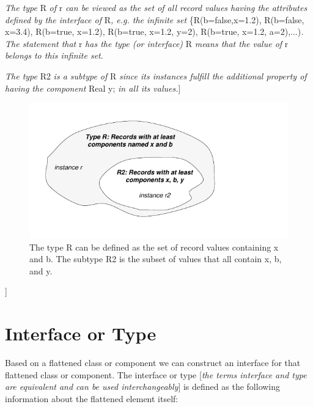 \documentclass[10pt,a4paper]{report}
\def\doublelabel#1{\label{#1}}
\begin{document}
\emph{The type} R \emph{of} r \emph{can be viewed as the set of all
record values having the attributes defined by the interface of}
R\emph{, e.g. the infinite set} \{R(b=false,x=1.2), R(b=false, x=3.4),
R(b=true, x=1.2), R(b=true, x=1.2, y=2), R(b=true, x=1.2,
a=2),...)\emph{. The statement that} r \emph{has the type (or
interface)} R \emph{means that the value of} r \emph{belongs to this
infinite set}.

\emph{The type} R2 \emph{is a subtype of} R \emph{since its instances
fulfill the additional property of having the component} Real y;
\emph{in all its values.}{]}

\begin{figure}
\caption{The type R can be defined as the set of
record values containing x and b. The subtype R2 is the subset of values
that all contain x, b, and y.}
\includegraphics{media/subtype.pdf}
\end{figure}
{]}

\section{Interface or Type}\doublelabel{interface-or-type}

Based on a flattened class or component we can construct an interface
for that flattened class or component. The interface or type
{[}\emph{the terms interface and type are equivalent and can be used
interchangeably}{]} is defined as the following information about the
flattened element itself:
\end{document}
